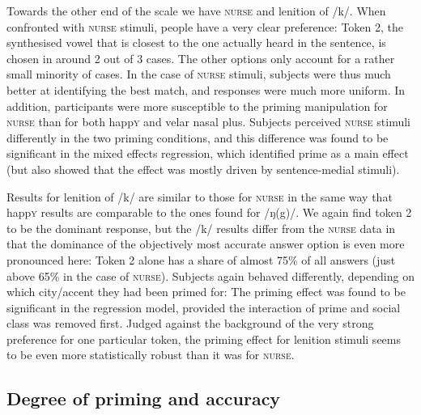 Towards the other end of the scale we have \textsc{nurse} and lenition of /k/.
When confronted with \textsc{nurse} stimuli, people have a very clear preference: Token 2, the synthesised vowel that is closest to the one actually heard in the sentence, is chosen in around 2 out of 3 cases.
The other options only account for a rather small minority of cases.
In the case of \textsc{nurse} stimuli, subjects were thus much better at identifying the best match, and responses were much more uniform.
In addition, participants were more susceptible to the priming manipulation for \textsc{nurse} than for both happ\textsc{y} and velar nasal plus.
Subjects perceived \textsc{nurse} stimuli differently in the two priming conditions, and this difference was found to be significant in the mixed effects regression, which identified prime as a main effect (but also showed that the effect was mostly driven by sentence-medial stimuli).

Results for lenition of /k/ are similar to those for \textsc{nurse} in the same way that happ\textsc{y} results are comparable to the ones found for /ŋ(g)/.
We again find token 2 to be the dominant response, but the /k/ results differ from the \textsc{nurse} data in that the dominance of the objectively most accurate answer option is even more pronounced here: Token 2 alone has a share of almost 75\% of all answers (just above 65\% in the case of \textsc{nurse}).
Subjects again behaved differently, depending on which city/accent they had been primed for: The priming effect was found to be significant in the regression model, provided the interaction of prime and social class was removed first.
Judged against the background of the very strong preference for one particular token, the priming effect for lenition stimuli seems to be even more statistically robust than it was for \textsc{nurse}.

		\subsection{Degree of priming and accuracy}

